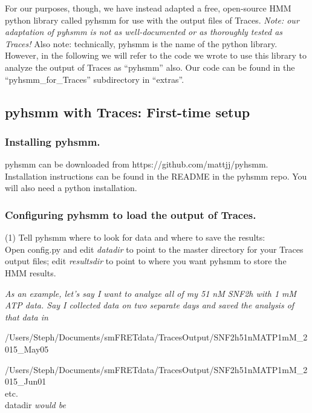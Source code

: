 \documentclass[11pt]{article}
\begin{document}
For our purposes, though, we have instead adapted a free, open-source HMM python library called pyhsmm for use with the output files of Traces. {\it Note: our adaptation of pyhsmm is not as well-documented or as thoroughly tested as Traces!} Also note: technically, pyhsmm is the name of the python library. However, in the following we will refer to the code we wrote to use this library to analyze the output of Traces as ``pyhsmm'' also. Our code can be found in the ``pyhsmm\_for\_Traces'' subdirectory in ``extras''.

\subsection{pyhsmm with Traces: First-time setup}

\subsubsection{Installing pyhsmm.}

pyhsmm can be downloaded from https://github.com/mattjj/pyhsmm. Installation instructions can be found in the README in the pyhsmm repo. You will also need a python installation.

\subsubsection{Configuring pyhsmm to load the output of Traces.}

(1) Tell pyhsmm where to look for data and where to save the results:\\
Open config.py and edit {\it datadir} to point to the master directory for your Traces output files; edit {\it resultsdir} to point to where you want pyhsmm to store the HMM results.

{\it As an example, let's say I want to analyze all of my 51 nM SNF2h with 1 mM ATP data. Say I collected data on two separate days and saved the analysis of that data in}

/Users/Steph/Documents/smFRETdata/TracesOutput/SNF2h51nMATP1mM\_2015\_May05

/Users/Steph/Documents/smFRETdata/TracesOutput/SNF2h51nMATP1mM\_2015\_Jun01\\
 etc. \\
 datadir {\it would be }
\end{document}
